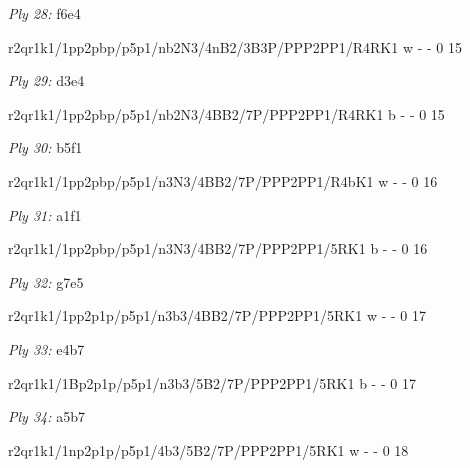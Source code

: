 \documentclass{article}
\begin{document}
\showboard

\bigskip

\emph{Ply 28:} f6e4

r2qr1k1/1pp2pbp/p5p1/nb2N3/4nB2/3B3P/PPP2PP1/R4RK1 w - - 0 15


\showboard

\bigskip

\emph{Ply 29:} d3e4


r2qr1k1/1pp2pbp/p5p1/nb2N3/4BB2/7P/PPP2PP1/R4RK1 b - - 0 15


\showboard

\bigskip

\emph{Ply 30:} b5f1

r2qr1k1/1pp2pbp/p5p1/n3N3/4BB2/7P/PPP2PP1/R4bK1 w - - 0 16


\showboard

\bigskip

\emph{Ply 31:} a1f1


r2qr1k1/1pp2pbp/p5p1/n3N3/4BB2/7P/PPP2PP1/5RK1 b - - 0 16


\showboard

\bigskip

\emph{Ply 32:} g7e5

r2qr1k1/1pp2p1p/p5p1/n3b3/4BB2/7P/PPP2PP1/5RK1 w - - 0 17


\showboard

\bigskip

\emph{Ply 33:} e4b7


r2qr1k1/1Bp2p1p/p5p1/n3b3/5B2/7P/PPP2PP1/5RK1 b - - 0 17


\showboard

\bigskip

\emph{Ply 34:} a5b7

r2qr1k1/1np2p1p/p5p1/4b3/5B2/7P/PPP2PP1/5RK1 w - - 0 18

\end{document}
